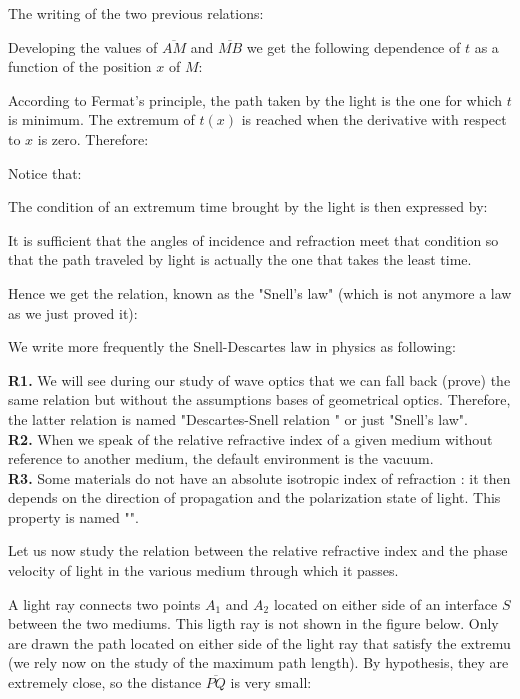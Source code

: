 	The writing of the two previous relations:
	
	Developing the values of $\overline{AM}$ and $\overline{MB}$ we get the following dependence of $t$ as a function of the position $x$ of $M$:
	
	According to Fermat's principle, the path taken by the light is the one for which $t$ is minimum. The extremum of $t (x)$ is reached when the derivative with respect to $x$ is zero. Therefore:
	
	Notice that:
	
	The condition of an extremum time brought by the light is then expressed by:
	
	It is sufficient that the angles of incidence and refraction meet that condition so that the path traveled by light is actually the one that takes the least time.
	
	Hence we get the relation, known as the "Snell's law" (which is not anymore a law as we just proved it):
	

	We write more frequently the Snell-Descartes law in physics as following:
	
	\begin{tcolorbox}[title=Remarks,colframe=black,arc=10pt]
	\textbf{R1.} We will see during our study of wave optics that we can fall back (prove) the same relation but without the assumptions bases of geometrical optics. Therefore, the latter relation is named "Descartes-Snell relation " or just "Snell's law".\\
	
	\textbf{R2.} When we speak of the relative refractive index of a given medium without reference to another medium, the default environment is the vacuum.\\
	
	\textbf{R3.} Some materials do not have an absolute isotropic index of refraction : it then depends on the direction of propagation and the polarization state of light. This property is named "".
	\end{tcolorbox}
	Let us now study the relation between the relative refractive index and the phase velocity of light in the various medium through which it passes.

	A light ray connects two points $A_1$ and $A_2$ located on either side of an interface $S$ between the two mediums. This ligth ray is not shown in the figure below. Only are drawn the path located on either side of the light ray that satisfy the extremu  (we rely now on the study of the maximum path length). By hypothesis, they are extremely close, so the distance $\overline{PQ}$ is very small:
	
